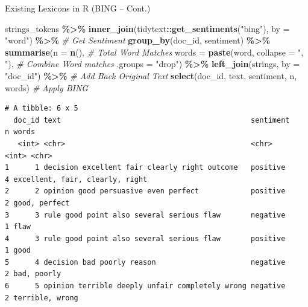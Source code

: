 \documentclass[
  ignorenonframetext,
  aspectratio=169]{beamer}
\newenvironment{Shaded}{\begin{snugshade}}{\end{snugshade}}
\newcommand{\AttributeTok}[1]{\textcolor[rgb]{0.13,0.29,0.53}{#1}}
\newcommand{\CommentTok}[1]{\textcolor[rgb]{0.56,0.35,0.01}{\textit{#1}}}
\newcommand{\FunctionTok}[1]{\textcolor[rgb]{0.13,0.29,0.53}{\textbf{#1}}}
\newcommand{\NormalTok}[1]{#1}
\newcommand{\SpecialCharTok}[1]{\textcolor[rgb]{0.81,0.36,0.00}{\textbf{#1}}}
\newcommand{\StringTok}[1]{\textcolor[rgb]{0.31,0.60,0.02}{#1}}
\begin{document}
\begin{frame}[fragile]{Existing Lexicons in R (BING -- Cont.)}
\label{existing-lexicons-in-r-bing-cont.-3}
\scriptsize

\begin{Shaded}
\begin{Highlighting}[]
\NormalTok{strings\_tokens }\SpecialCharTok{\%\textgreater{}\%}
  \FunctionTok{inner\_join}\NormalTok{(tidytext}\SpecialCharTok{::}\FunctionTok{get\_sentiments}\NormalTok{(}\StringTok{"bing"}\NormalTok{), }\AttributeTok{by =} \StringTok{"word"}\NormalTok{) }\SpecialCharTok{\%\textgreater{}\%} \CommentTok{\# Get Sentiment}
  \FunctionTok{group\_by}\NormalTok{(doc\_id, sentiment) }\SpecialCharTok{\%\textgreater{}\%}
  \FunctionTok{summarise}\NormalTok{(}\AttributeTok{n =} \FunctionTok{n}\NormalTok{(), }\CommentTok{\# Total Word Matches}
            \AttributeTok{words =} \FunctionTok{paste}\NormalTok{(word, }\AttributeTok{collapse =} \StringTok{", "}\NormalTok{), }\CommentTok{\# Combine Word matches}
            \AttributeTok{.groups =} \StringTok{"drop"}\NormalTok{) }\SpecialCharTok{\%\textgreater{}\%}
  \FunctionTok{left\_join}\NormalTok{(strings, }\AttributeTok{by =} \StringTok{"doc\_id"}\NormalTok{) }\SpecialCharTok{\%\textgreater{}\%} \CommentTok{\# Add Back Original Text}
  \FunctionTok{select}\NormalTok{(doc\_id, text, sentiment, n, words) }\CommentTok{\# Apply BING}
\end{Highlighting}
\end{Shaded}

\begin{verbatim}
# A tibble: 6 x 5
  doc_id text                                            sentiment     n words                          
   <int> <chr>                                           <chr>     <int> <chr>                          
1      1 decision excellent fair clearly right outcome   positive      4 excellent, fair, clearly, right
2      2 opinion good persuasive even perfect            positive      2 good, perfect                  
3      3 rule good point also several serious flaw       negative      1 flaw                           
4      3 rule good point also several serious flaw       positive      1 good                           
5      4 decision bad poorly reason                      negative      2 bad, poorly                    
6      5 opinion terrible deeply unfair completely wrong negative      2 terrible, wrong                
\end{verbatim}
\end{frame}
\end{document}
